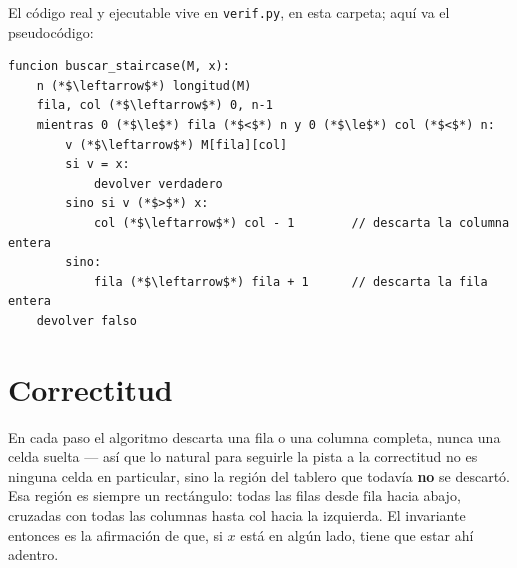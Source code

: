 \documentclass[11pt]{article}
\begin{document}
El código real y ejecutable vive en \texttt{verif.py}, en esta carpeta; aquí va el pseudocódigo:

\begin{lstlisting}[style=pseudo]
funcion buscar_staircase(M, x):
    n (*$\leftarrow$*) longitud(M)
    fila, col (*$\leftarrow$*) 0, n-1
    mientras 0 (*$\le$*) fila (*$<$*) n y 0 (*$\le$*) col (*$<$*) n:
        v (*$\leftarrow$*) M[fila][col]
        si v = x:
            devolver verdadero
        sino si v (*$>$*) x:
            col (*$\leftarrow$*) col - 1        // descarta la columna entera
        sino:
            fila (*$\leftarrow$*) fila + 1      // descarta la fila entera
    devolver falso
\end{lstlisting}

\section{Correctitud}

En cada paso el algoritmo descarta una fila o una columna completa, nunca una celda suelta --- así que lo
natural para seguirle la pista a la correctitud no es ninguna celda en particular, sino la región del
tablero que todavía \textbf{no} se descartó. Esa región es siempre un rectángulo: todas las filas desde
$\mathrm{fila}$ hacia abajo, cruzadas con todas las columnas hasta $\mathrm{col}$ hacia la izquierda. El
invariante entonces es la afirmación de que, si $x$ está en algún lado, tiene que estar ahí adentro.
\end{document}
